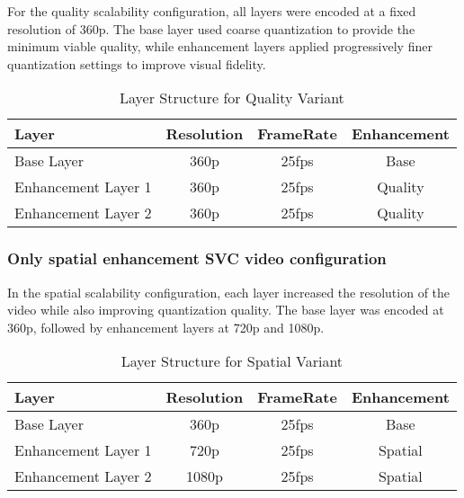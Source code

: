 For the quality scalability configuration, all layers were encoded at a fixed
resolution of 360p. The base layer used coarse quantization to provide the
minimum viable quality, while enhancement layers applied progressively finer
quantization settings to improve visual fidelity.

\begin{table}[H]
    \centering
    \begin{tabular}{l|c|c|c}
        \toprule
        Layer               & Resolution    & FrameRate     & Enhancement   \\
        \midrule
        Base Layer          & 360p          & 25fps     & Base          \\
        Enhancement Layer 1 & 360p          & 25fps     & Quality       \\
        Enhancement Layer 2 & 360p          & 25fps     & Quality       \\
        \bottomrule
    \end{tabular}
    \caption{Layer Structure for Quality Variant}
    \label{tab:layer_structure_quality}
\end{table}

\subsubsection{Only spatial enhancement SVC video configuration}

In the spatial scalability configuration, each layer increased the resolution of
the video while also improving quantization quality. The base layer was encoded
at 360p, followed by enhancement layers at 720p and 1080p.

\begin{table}[H]
    \centering
    \begin{tabular}{l|c|c|c}
        \toprule
        Layer               & Resolution    & FrameRate & Enhancement   \\
        \midrule
        Base Layer          & 360p          & 25fps     & Base         \\
        Enhancement Layer 1 & 720p          & 25fps     & Spatial      \\
        Enhancement Layer 2 & 1080p         & 25fps     & Spatial      \\
        \bottomrule
    \end{tabular}
    \caption{Layer Structure for Spatial Variant}
    \label{tab:layer_structure_spatial}
\end{table}

